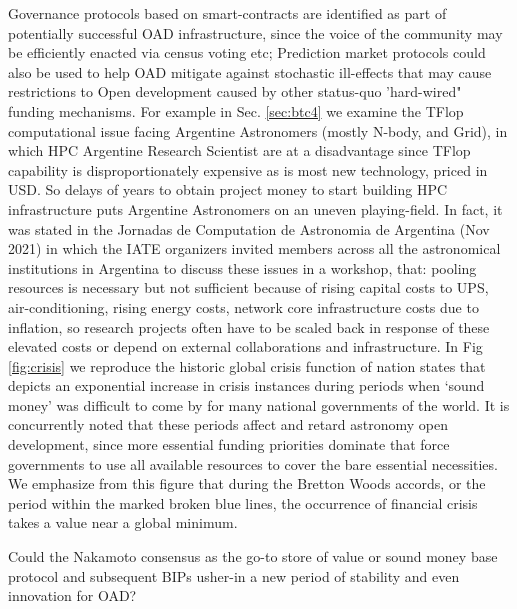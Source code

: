 \documentclass[final,5p,times,twocolumn,authoryear]{elsarticle}
\begin{document}
Governance protocols based on smart-contracts are identified as part of potentially successful OAD infrastructure, since the voice of the community may be efficiently enacted via census voting etc; Prediction market protocols could also be used to help OAD mitigate against stochastic ill-effects that may cause restrictions to Open development caused by other status-quo 'hard-wired" funding mechanisms. For example in Sec. \ref{sec:btc4} we examine the TFlop computational issue facing Argentine Astronomers (mostly N-body, and Grid), in which HPC Argentine Research Scientist are at a disadvantage since TFlop capability is disproportionately expensive as is most new technology, priced in USD. So delays of years to obtain project money to start building HPC infrastructure puts Argentine Astronomers on an uneven playing-field. In fact, it was stated in the Jornadas de Computation de Astronomia de Argentina (Nov 2021)  in which the IATE organizers invited members across all the astronomical institutions in Argentina to discuss these issues in a workshop, that: pooling resources is necessary but not sufficient because of rising capital costs to UPS, air-conditioning, rising energy costs, network core infrastructure costs due to inflation, so research projects often have to be scaled back in response of these elevated costs or depend on external collaborations and infrastructure. In Fig \ref{fig:crisis} we reproduce the historic global crisis function of nation states that depicts an exponential increase in crisis instances during periods when `sound money' was difficult to come by for many national governments of the world. It is concurrently noted that these periods affect and retard astronomy open development, since more essential funding priorities dominate that force governments to use all available resources to cover the bare essential necessities. We emphasize from this figure that during the Bretton Woods accords, or the period within the marked broken blue lines, the occurrence of financial crisis takes a value near a global minimum. 

Could the Nakamoto consensus as the go-to store of value or sound money base protocol and subsequent BIPs usher-in a new period of stability and even innovation for OAD? 
\end{document}
